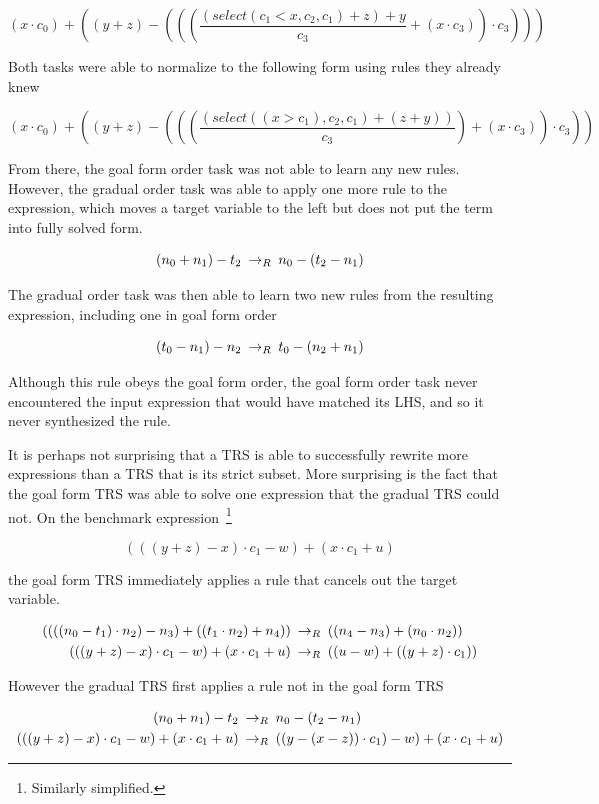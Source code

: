 \[ (x \cdot c_0) + ((y + z) - (((\frac{(select(c_1 < x, c_2, c_1) + z) + y}{c_3} + (x \cdot c_3)) \cdot c_3)))
\]

Both tasks were able to normalize to the following form using rules they already knew

\[ (x \cdot c_0) + ((y + z) - (((\frac{(select((x > c_1), c_2, c_1) + (z + y))}{c_3}) + (x \cdot c_3)) \cdot c_3))
\]

From there, the goal form order task was not able to learn any new rules. However, the gradual order task was able to apply one more rule to the expression, which moves a target variable to the left but does not put the term into fully solved form.

\[ (n_0 + n_1) - t_2 \:\rightarrow_{R}\: n_0 - (t_2 - n_1)
\]

The gradual order task was then able to learn two new rules from the resulting expression, including one in goal form order

\[ (t_0 - n_1) - n_2 \:\rightarrow_{R}\: t_0 - (n_2  + n_1)
\]

Although this rule obeys the goal form order, the goal form order task never encountered the input expression that would have matched its LHS, and so it never synthesized the rule.

It is perhaps not surprising that a TRS is able to successfully rewrite more expressions than a TRS that is its strict subset. More surprising is the fact that the goal form TRS was able to solve one expression that the gradual TRS could not. On the benchmark expression~\footnote{Similarly simplified.}

\[ (((y + z) - x) \cdot c_1 - w) + (x \cdot c_1 + u)
\]

the goal form TRS immediately applies a rule that cancels out the target variable.

\begin{align*} 
((((n_0 - t_1) \cdot n_2) - n_3) + ((t_1 \cdot n_2) + n_4)) & \:\rightarrow_{R}\: ((n_4 - n_3) + (n_0 \cdot n_2)) \\
(((y + z) - x) \cdot c_1 - w) + (x \cdot c_1 + u) & \:\rightarrow_{R}\: ((u - w) + ((y + z) \cdot c_1))
\end{align*}

However the gradual TRS first applies a rule not in the goal form TRS

\begin{align*}
(n_0 + n_1) - t_2 & \:\rightarrow_{R}\: n_0 - (t_2 - n_1) \\
(((y + z) - x) \cdot c_1 - w) + (x \cdot c_1 + u) & \:\rightarrow_{R}\: ((y - (x - z)) \cdot c_1) - w) + (x \cdot c_1 + u)
\end{align*}

